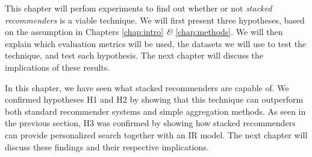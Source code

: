\label{chap:results}

This chapter will perfom experiments to find out whether or not
\emph{stacked recommenders} is a viable technique.
We will first present three hypotheses, based on the assumption in Chapters 
\ref{chap:intro} \emph{\&} \ref{chap:methods}.
We will then explain which evaluation metrics will be used,
the datasets we will use to test the technique,
and test each hypothesis.
The next chapter will discuss the implications of these results.








\hr

In this chapter, we have seen what stacked recommenders are capable of.
We confirmed hypotheses H1 and H2 by showing that this technique
can outperform both standard recommender systems and 
simple aggregation methods. As seen in the previous section,
H3 was confirmed by showing how stacked recommenders can provide
personalized search together with an IR model.
The next chapter will discuss these findings and their respective implications.

